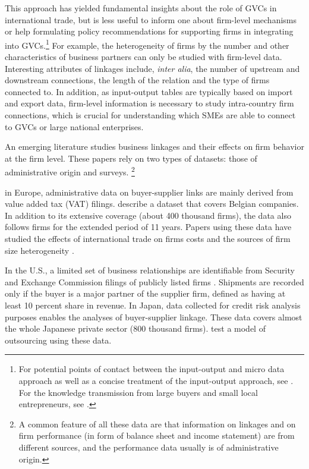\documentclass[final, dvipsnames, authoryear,12pt]{elsarticle}
\begin{document}
This approach has yielded fundamental insights about the role of GVCs in international trade, but is less useful to inform one about firm-level mechanisms or help formulating policy recommendations for supporting firms in integrating into GVCs.\footnote{For potential points of contact between the input-output and micro data approach as well as a concise treatment of the input-output approach, see \cite{johnson2018measuring}. For the knowledge transmission from large buyers and small local entrepreneurs, see \citep{schmitz2000learning}.} For example, the heterogeneity of firms by the number and other characteristics of business partners can only be studied with firm-level data. Interesting attributes of linkages include, \textit{inter alia}, the number of upstream and downstream connections, the length of the relation and the type of firms connected to. In addition, as input-output tables are typically based on import and export data, firm-level information is necessary to study intra-country firm connections, which is crucial for understanding which SMEs are able to connect to GVCs or large national enterprises.

An emerging literature studies business linkages and their effects on firm behavior at the firm level. These papers rely on two types of datasets: those of administrative origin and surveys. \footnote{A common feature of all these data are that information on linkages and on firm performance (in form of balance sheet and income statement) are from different sources, and the performance data usually is of administrative origin.} 

in Europe, administrative data on buyer-supplier links are mainly derived from value added tax (VAT) filings. \cite{dhyne2015belgian} describe a dataset that covers Belgian companies. In addition to its extensive coverage (about 400 thousand firms), the data also follows firms for the extended period of 11 years. Papers using these data have studied the effects of international trade on firms costs \citep{tintelnot2018trade} and the sources of firm size heterogeneity \citep{bernard2019production}. 

In the U.S., a limited set of business relationships are identifiable from Security and Exchange Commission filings of publicly listed firms \citep{Barrot2016-wc}. Shipments are recorded only if the buyer is a major partner of the supplier firm, defined as having at least 10 percent share in revenue. In Japan, data collected for credit risk analysis purposes enables the analyses of buyer-supplier linkage. These data covers almost the whole Japanese private sector (800 thousand firms). \cite{bernard2019production} test a model of outsourcing using these data. 
\end{document}
